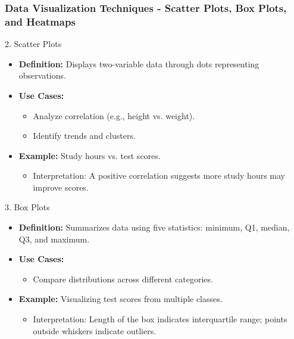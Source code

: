 \documentclass[aspectratio=169]{beamer}
\begin{document}
\begin{frame}[fragile]
    \frametitle{Data Visualization Techniques - Scatter Plots, Box Plots, and Heatmaps}
    \begin{block}{2. Scatter Plots}
        \begin{itemize}
            \item \textbf{Definition:} Displays two-variable data through dots representing observations.
            \item \textbf{Use Cases:}
                \begin{itemize}
                    \item Analyze correlation (e.g., height vs. weight).
                    \item Identify trends and clusters.
                \end{itemize}
            \item \textbf{Example:} Study hours vs. test scores.
                \begin{itemize}
                    \item Interpretation: A positive correlation suggests more study hours may improve scores.
                \end{itemize}
        \end{itemize}
    \end{block}
    \begin{block}{3. Box Plots}
        \begin{itemize}
            \item \textbf{Definition:} Summarizes data using five statistics: minimum, Q1, median, Q3, and maximum.
            \item \textbf{Use Cases:}
                \begin{itemize}
                    \item Compare distributions across different categories.
                \end{itemize}
            \item \textbf{Example:} Visualizing test scores from multiple classes.
                \begin{itemize}
                    \item Interpretation: Length of the box indicates interquartile range; points outside whiskers indicate outliers.
                \end{itemize}
        \end{itemize}
    \end{block}
\end{frame}
\end{document}
